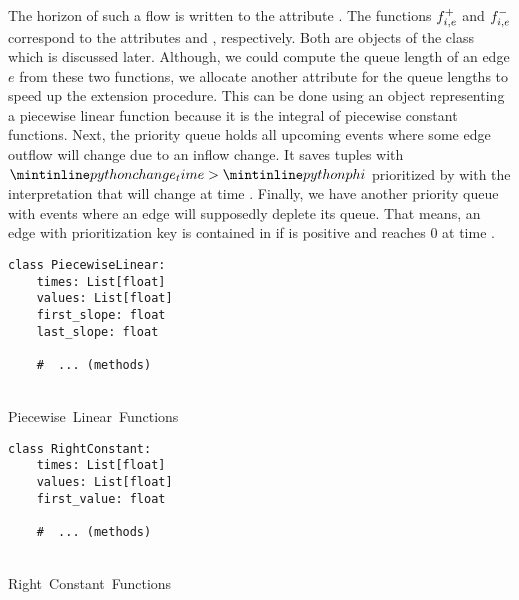 The horizon of such a flow is written to the attribute .
The functions ${f}^+_{i,e}$ and ${f}^-_{i,e}$ correspond to the attributes  and , respectively.
Both are objects of the class  which is discussed later.
Although, we could compute the queue length of an edge $e$ from these two functions, we allocate 
another attribute  for the queue lengths to speed up the extension procedure.
This can be done using an object representing a piecewise linear function because it is the integral of piecewise constant functions.
Next, the priority queue  holds all upcoming events where some edge outflow will change due to an inflow change.
It saves tuples  with $\code{change_time} > \code{phi}$ prioritized by  with the interpretation that  will change at time .
Finally, we have another priority queue  with events where an edge will supposedly deplete its queue.
That means, an edge  with prioritization key  is contained in  if  is positive and  reaches $0$ at time .

\begin{minipage}[t]{0.45\textwidth}
\begin{classdef}[H]
    \begin{verbatim}
class PiecewiseLinear:
    times: List[float]
    values: List[float]
    first_slope: float
    last_slope: float

    #  ... (methods)
\end{verbatim}
    \caption{\\Piecewise~Linear~Functions}%
\end{classdef}
\end{minipage}\hfill
\begin{minipage}[t]{0.45\textwidth}
\begin{classdef}[H]
    \begin{verbatim}
class RightConstant:
    times: List[float]
    values: List[float]
    first_value: float

    #  ... (methods)
\end{verbatim}
    \caption{\\Right~Constant~Functions}%
\end{classdef}
\end{minipage}




